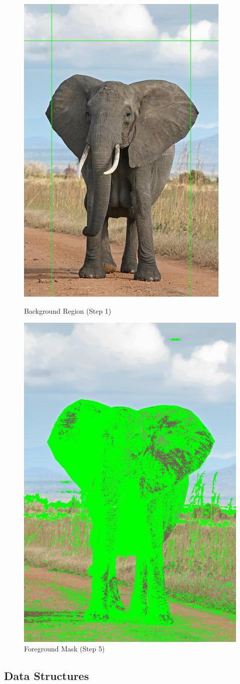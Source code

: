\documentclass[12pt]{article}
\begin{document}
\begin{figure}[!htb]
    \begin{minipage}{0.48\textwidth}
        \centering
        \includegraphics[width=0.5\linewidth]{border.jpg}
        \caption{Background Region (Step 1)}
    \end{minipage}\hfill
    \begin{minipage}{0.48\textwidth}
        \centering
        \includegraphics[width=0.5\linewidth]{mask.jpg}
        \caption{Foreground Mask (Step 5)}
    \end{minipage}\hfill
\end{figure}

\subsection{Data Structures}
\end{document}
